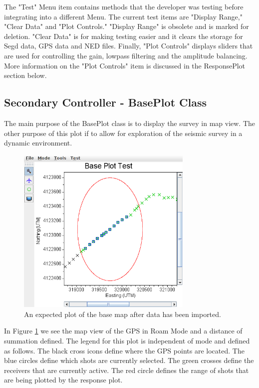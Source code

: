 \documentclass[12pt]{article}
\begin{document}
The "Test" Menu item contains methods that the developer was testing before integrating into a different Menu. The current test items are "Display Range," "Clear Data" and "Plot Controls." "Display Range" is obsolete and is marked for deletion. "Clear Data" is for making testing easier and it clears the storage for Segd data, GPS data and NED files. Finally, "Plot Controls" displays sliders that are used for controlling the gain, lowpass filtering and the amplitude balancing. More information on the "Plot Controls" item is discussed in the ResponsePlot section below.

\subsection{Secondary Controller - BasePlot Class}

The main purpose of the BasePlot class is to display the survey in map view. The other purpose of this plot if to allow for exploration of the seismic survey in a dynamic environment. 

\begin{figure}[H]
\centering
\includegraphics[width=0.75\textwidth]{./figs/fig1.png}
\caption{An expected plot of the base map after data has been imported.}
\label{FIG:BP}
\end{figure}

In Figure \ref{FIG:BP} we see the map view of the GPS in Roam Mode and a distance of summation defined. The legend for this plot is independent of mode and defined as follows. The black cross icons define where the GPS points are located. The blue circles define which shots are currently selected. The green crosses define the receivers that are currently active. The red circle defines the range of shots that are being plotted by the response plot.
\end{document}
